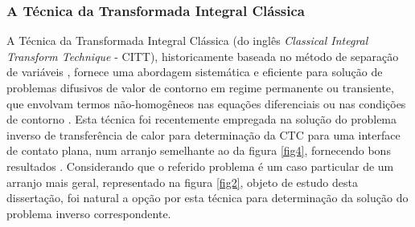 \subsubsection{A Técnica da Transformada Integral Clássica}

A Técnica da Transformada Integral Clássica (do inglês \textit{Classical Integral Transform Technique} - CITT), historicamente baseada no método de separação de variáveis \citep{livro_boyce},
fornece uma abordagem sistemática e eficiente para solução
de problemas difusivos de valor de contorno em regime permanente ou transiente, que envolvam termos não-homogêneos nas equações diferenciais ou nas condições
de contorno \citep{livro_ozisik}. Esta técnica foi recentemente empregada na solução do problema inverso de transferência de calor para determinação da CTC para
uma interface de contato plana, num arranjo semelhante ao da figura \ref{fig4}, fornecendo bons resultados \citep{tese_padilha}. Considerando que o referido problema é um caso particular
de um arranjo mais geral, representado na figura \ref{fig2}, objeto de estudo desta dissertação, foi natural a opção por esta técnica para determinação da solução do problema inverso correspondente.
